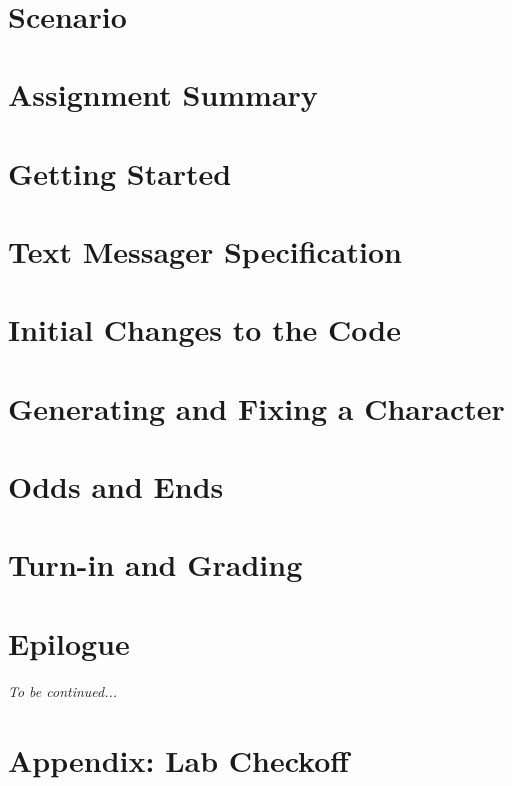 \documentclass[12pt]{article}
\begin{document}
    \labidentifier\


    \softwareengineeringfrontmatter

    \section*{Scenario}                                                             \scenariointroduction

    \section{Assignment Summary}                                                    

    \section{Getting Started} \label{sec:GettingStarted}                            

    \section{Text Messager Specification} \label{sec:spec}                          

    \section{Initial Changes to the Code} \label{sec:LabTime}                       

    \section{Generating and Fixing a Character} \label{sec:characterGeneration}     

    \section{Odds and Ends} \label{sec:oddsAndEnds}                                 

    \section{Turn-in and Grading}                                                   

    \section*{Epilogue}                                                             \scenariowrapup

    \textit{To be continued...}

    \appendix

    \section{Appendix: Lab Checkoff}                                                
\end{document}
